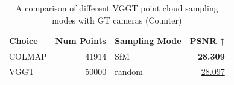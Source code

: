 \begin{table}[H]
\caption{\ifdefined\customcaption \customcaption \else A comparison of different VGGT point cloud sampling modes with GT cameras (Counter) \fi}
\label{tab:03_sampling_mode_brief_counter}
\centering
\scriptsize
\begin{tabular}{lrlr}
\toprule
Choice & Num Points & Sampling Mode & PSNR ↑ \\
\midrule
COLMAP & 41914 & SfM & \textbf{28.309} \\
VGGT & 50000 & random & \underline{28.097} \\
\bottomrule
\end{tabular}
\end{table}